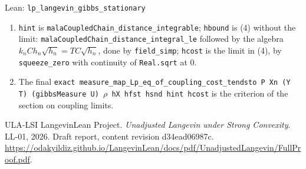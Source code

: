 \documentclass[11pt,a4paper]{article}
\begin{document}
\begin{leanbox}{Lean: \texttt{lp\_\allowbreak{}langevin\_\allowbreak{}gibbs\_\allowbreak{}stationary}}
\begin{enumerate}
\item \texttt{hint} is \texttt{mala\allowbreak{}Coupled\allowbreak{}Chain\_\allowbreak{}distance\_\allowbreak{}integrable}; \texttt{hbound} is (4) without the limit: \texttt{mala\allowbreak{}Coupled\allowbreak{}Chain\_\allowbreak{}distance\_\allowbreak{}integral\_\allowbreak{}le} followed by the algebra \(k_nCh_n\sqrt{h_n}=TC\sqrt{h_n}\), done by \texttt{field\_\allowbreak{}simp}; \texttt{hcost} is the limit in (4), by \texttt{squeeze\_\allowbreak{}zero} with continuity of \texttt{Real.\allowbreak{}sqrt} at \(0\).

\item The final \texttt{exact measure\_\allowbreak{}map\_\allowbreak{}Lp\_\allowbreak{}eq\_\allowbreak{}of\_\allowbreak{}coupling\_\allowbreak{}cost\_\allowbreak{}tendsto P Xn (Y T) (gibbs\allowbreak{}Measure U) \ensuremath{\rho} h\allowbreak{}X hfst hsnd hint hcost} is the criterion of the section on coupling limits.

\end{enumerate}
\end{leanbox}

\begin{thebibliography}{ULA-LSI}
LangevinLean Project. \emph{Unadjusted Langevin under Strong Convexity}. LL-01, 2026. Draft report, content revision d34ead06987c. \url{https://odakyildiz.github.io/LangevinLean/docs/pdf/UnadjustedLangevin/FullProof.pdf}.
\end{thebibliography}
\end{document}
